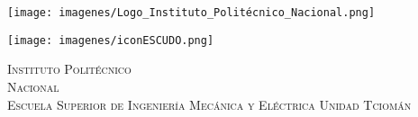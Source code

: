  \begin{titlepage}
  \begin{center}		
\newcommand{\HRule}{\rule{\linewidth}{0.5mm}}	
\begin{minipage}{0.48\textwidth} \begin{flushleft}
\texttt{[image: imagenes/Logo\_Instituto\_Politécnico\_Nacional.png]}
\end{flushleft}\end{minipage}
\begin{minipage}{0.48\textwidth} \begin{flushright}
\texttt{[image: imagenes/iconESCUDO.png]}
\end{flushright}\end{minipage}
\vspace*{0.2cm}
\textsc{\huge Instituto Polit\'ecnico\\ \vspace{5px} Nacional}\\[0.5cm]	
\textsc{\LARGE Escuela Superior de Ingeniería Mecánica y Eléctrica Unidad Tciom\'an}\\[1cm]




\end{center}
\end{titlepage}
